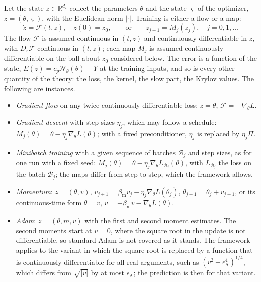 \documentclass[11pt]{article}
\theoremstyle{definition}
\theoremstyle{remark}
\newcommand{\R}{\mathbb{R}}
\newcommand{\Net}{\mathcal{N}_\theta}    %
\begin{document}
Let the state $z\in\R^{d_z}$ collect the parameters $\theta$ and the state $\varsigma$ of the optimizer, $z = (\theta,\varsigma)$, with the Euclidean norm $|\cdot|$.
Training is either a flow or a map:
\begin{equation}\label{eq:trainingsystem}
\dot z = \mathcal{F}(t, z),\quad z(0) = z_0,\qquad\text{or}\qquad z_{j+1} = M_j(z_j),\quad j = 0, 1, \dots
\end{equation}
The flow $\mathcal{F}$ is assumed continuous in $(t, z)$ and continuously differentiable in $z$, with $D_z\mathcal{F}$ continuous in $(t, z)$; each map $M_j$ is assumed continuously differentiable on the ball about $z_0$ considered below.
The error is a function of the state, $E(z) = c_p\Net(\theta) - Y$ at the training inputs, and so is every other quantity of the theory: the loss, the kernel, the slow part, the Krylov values.
The following are instances.
\begin{itemize}
\item \emph{Gradient flow} on any twice continuously differentiable loss: $z = \theta$, $\mathcal{F} = -\nabla_\theta L$.
\item \emph{Gradient descent} with step sizes $\eta_j$, which may follow a schedule: $M_j(\theta) = \theta - \eta_j\nabla_\theta L(\theta)$; with a fixed preconditioner, $\eta_j$ is replaced by $\eta_j\Pi$.
\item \emph{Minibatch training} with a given sequence of batches $\mathcal{B}_j$ and step sizes, as for one run with a fixed seed: $M_j(\theta) = \theta - \eta_j\nabla_\theta L_{\mathcal{B}_j}(\theta)$, with $L_{\mathcal{B}_j}$ the loss on the batch $\mathcal{B}_j$; the maps differ from step to step, which the framework allows.
\item \emph{Momentum}: $z = (\theta, v)$, $v_{j+1} = \beta_{\mathrm m}v_j - \eta_j\nabla_\theta L(\theta_j)$, $\theta_{j+1} = \theta_j + v_{j+1}$, or its continuous-time form $\dot\theta = v$, $\dot v = -\beta_{\mathrm m}v - \nabla_\theta L(\theta)$.
\item \emph{Adam}: $z = (\theta, m, v)$ with the first and second moment estimates.
The second moments start at $v = 0$, where the square root in the update is not differentiable, so standard Adam is not covered as it stands.
The framework applies to the variant in which the square root is replaced by a function that is continuously differentiable for all real arguments, such as $(v^2 + \epsilon_{\mathrm A}^4)^{1/4}$, which differs from $\sqrt{|v|}$ by at most $\epsilon_{\mathrm A}$; the prediction is then for that variant.
\end{itemize}
\end{document}
